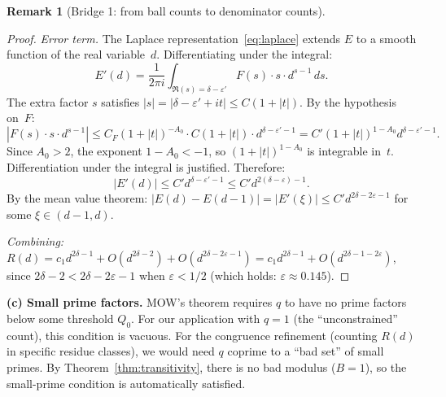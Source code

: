 \documentclass[11pt,a4paper]{amsart}
\theoremstyle{definition}
\newtheorem{remark}[theorem]{Remark}
\begin{document}
\begin{remark}[Bridge 1: from ball counts to denominator counts]
\begin{proof}
\emph{Error term.} The Laplace representation~\eqref{eq:laplace} extends $E$ to a smooth function of the real variable~$d$. Differentiating under the integral:
\[
E'(d) = \frac{1}{2\pi i} \int_{\Re(s) = \delta-\varepsilon'} F(s) \cdot s \cdot d^{s-1}\, ds.
\]
The extra factor $s$ satisfies $|s| = |\delta-\varepsilon'+it| \leq C(1+|t|)$. By the hypothesis on~$F$:
\[
|F(s) \cdot s \cdot d^{s-1}| \leq C_F (1+|t|)^{-A_0} \cdot C(1+|t|) \cdot d^{\delta-\varepsilon'-1} = C' (1+|t|)^{1-A_0} d^{\delta-\varepsilon'-1}.
\]
Since $A_0 > 2$, the exponent $1 - A_0 < -1$, so $(1+|t|)^{1-A_0}$ is integrable in~$t$. Differentiation under the integral is justified. Therefore:
\[
|E'(d)| \leq C' d^{\delta-\varepsilon'-1} \leq C' d^{2(\delta-\varepsilon)-1}.
\]
By the mean value theorem: $|E(d) - E(d-1)| = |E'(\xi)| \leq C' d^{2\delta-2\varepsilon-1}$ for some $\xi \in (d-1,d)$.

\emph{Combining:} $R(d) = c_1 d^{2\delta-1} + O(d^{2\delta-2}) + O(d^{2\delta-2\varepsilon-1}) = c_1 d^{2\delta-1} + O(d^{2\delta-1-2\varepsilon})$, since $2\delta - 2 < 2\delta - 2\varepsilon - 1$ when $\varepsilon < 1/2$ (which holds: $\varepsilon \approx 0.145$).
\end{proof}

\textbf{(c) Small prime factors.} MOW's theorem requires $q$ to have no prime factors below some threshold $Q_0$. For our application with $q = 1$ (the ``unconstrained'' count), this condition is vacuous. For the congruence refinement (counting $R(d)$ in specific residue classes), we would need $q$ coprime to a ``bad set'' of small primes. By Theorem~\ref{thm:transitivity}, there is no bad modulus ($B = 1$), so the small-prime condition is automatically satisfied.
\end{remark}
\end{document}
